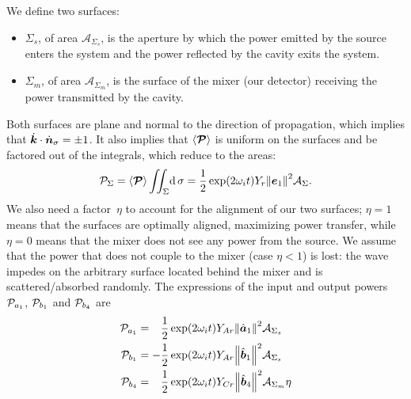 \begin{samepage}
We define two surfaces:
\begin{itemize}
    \item 
        $\Sigma_s$, of area $\mathcal{A}_{\Sigma_s}$,
        is the aperture by which the power emitted by the source enters the system
        and the power reflected by the cavity exits the system.
    \item
        $\Sigma_m$, of area $\mathcal{A}_{\Sigma_m}$,
        is the surface of the mixer (our detector) receiving the power transmitted by the cavity.
\end{itemize}
\end{samepage}
Both surfaces are plane and normal to the direction of propagation,
which implies that $\dot{\bm{k}}\cdot\dot{\bm{n}}_\sigma=\pm1$.
It also implies that $\langle \bm{\mathcal{P}} \rangle$ is uniform on the surfaces and be factored out of the integrals, which reduce to the areas:
\begin{equation}
    \power{P}_\Sigma
    =
    \timeavg{\vect{\power{P}}}
    \iint_\Sigma
    \!
    \dif\sigma
    =
    \frac{1}{2}
    \exp(2\omega_i t)
    Y_r
    \norm{\vect{e}_1}^2
    \mathcal{A}_\Sigma
    \text{.}
\end{equation}
We also need a factor~$\eta$ to account for the alignment of our two surfaces;
$\eta=1$ means that the surfaces are optimally aligned, maximizing power transfer,
while $\eta=0$ means that the mixer does not see any power from the source.
We assume that the power that does not couple to the mixer (case $\eta<1$) is lost: the wave impedes on the arbitrary surface located behind the mixer and is scattered/absorbed randomly.
The expressions of the input and output powers
$\mathcal{P}_{a_1}$, $\mathcal{P}_{b_1}$ and $\mathcal{P}_{b_4}$ are
\begin{align}
    \power{P}_{a_1}
    &=
    \phantom{\mathrel{-}}
    \frac{1}{2}
    \exp(2\omega_i t)
    Y_{Ar}
    \norm{\vectcp{a}_1}^2
    \mathcal{A}_{\Sigma_s}
    \\%
    \power{P}_{b_1}
    &=
    -
    \frac{1}{2}
    \exp(2\omega_i t)
    Y_{Ar}
    \norm{\vectcp{b}_1}^2
    \mathcal{A}_{\Sigma_s}
    \\%
    \power{P}_{b_4}
    &=
    \phantom{\mathrel{-}}
    \frac{1}{2}
    \exp(2\omega_i t)
    Y_{Cr}
    \norm{\vectcp{b}_4}^2
    \mathcal{A}_{\Sigma_m}
    \eta
\end{align}
